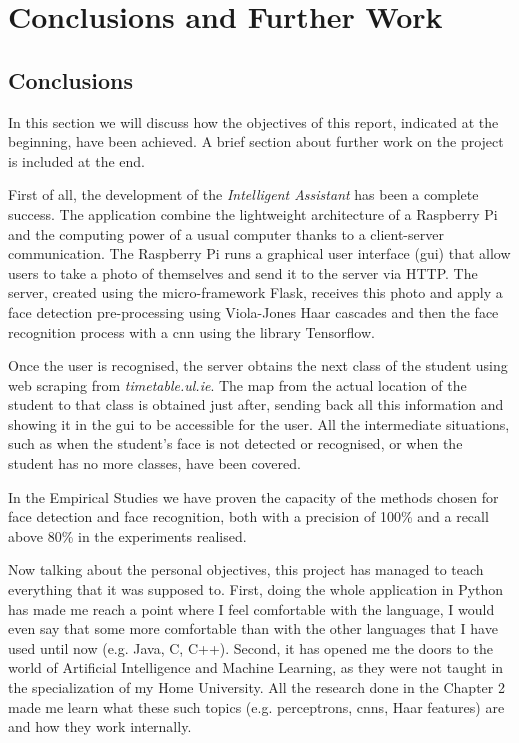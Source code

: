 \chapter{Conclusions and Further Work}
\label{ch:conclusions}

\section{Conclusions}
In this section we will discuss how the objectives of this report, indicated at the beginning, have been achieved. A brief section about further work on the project is included at the end.

First of all, the development of the \textit{Intelligent Assistant} has been a complete success. The application combine the lightweight architecture of a Raspberry Pi and the computing power of a usual computer thanks to a client-server communication. The Raspberry Pi runs a graphical user interface (\gls{gui}) that allow users to take a photo of themselves and send it to the server via HTTP. The server, created using the micro-framework Flask, receives this photo and apply a face detection pre-processing using Viola-Jones Haar cascades and then the face recognition process with a \gls{cnn} using the library Tensorflow.

Once the user is recognised, the server obtains the next class of the student using web scraping from \textit{timetable.ul.ie}. The map from the actual location of the student to that class is obtained just after, sending back all this information and showing it in the \gls{gui} to be accessible for the user. All the intermediate situations, such as when the student's face is not detected or recognised, or when the student has no more classes, have been covered. 

In the Empirical Studies we have proven the capacity of the methods chosen for face detection and face recognition, both with a precision of 100\% and a recall above 80\% in the experiments realised. 

Now talking about the personal objectives, this project has managed to teach everything that it was supposed to. First, doing the whole application in Python has made me reach a point where I feel comfortable with the language, I would even say that some more comfortable than with the other languages that I have used until now (e.g. Java, C, C++). Second, it has opened me the doors to the world of Artificial Intelligence and Machine Learning, as they were not taught in the specialization of my Home University. All the research done in the Chapter 2 made me learn what these such topics (e.g. perceptrons, \glspl{cnn}, Haar features) are and how they work internally.

